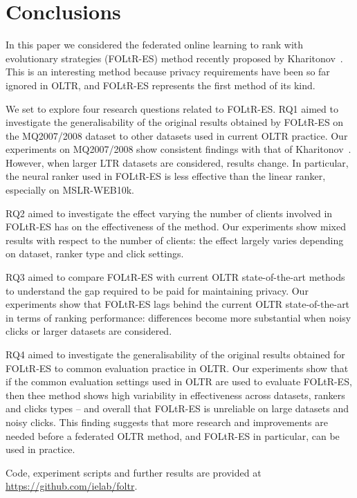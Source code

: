 \section{Conclusions}

In this paper we considered the federated online learning to rank with evolutionary strategies (FOLtR-ES) method recently proposed by Kharitonov~\cite{kharitonov2019federated}. This is an interesting method because privacy requirements have been so far ignored in OLTR, and FOLtR-ES represents the first method of its kind. 

We set to explore four research questions related to FOLtR-ES. RQ1 aimed to investigate the generalisability of the original results obtained by FOLtR-ES on the MQ2007/2008 dataset to other datasets used in current OLTR practice. Our  experiments on MQ2007/2008 show consistent findings with that of Kharitonov~\cite{kharitonov2019federated}. However, when larger LTR datasets are considered, results change. In particular, the neural ranker used in FOLtR-ES is less effective than the linear ranker, especially on MSLR-WEB10k. %

RQ2 aimed to investigate the effect varying the number of clients involved in FOLtR-ES has on the effectiveness of the method. %
Our experiments show mixed results with respect to the number of clients: the effect largely varies depending on dataset, ranker type and click settings. 

RQ3 aimed to compare FOLtR-ES with current OLTR state-of-the-art methods to understand the gap required to be paid for maintaining privacy. Our experiments show that FOLtR-ES lags behind the current OLTR state-of-the-art in terms of ranking performance: differences become more substantial when noisy clicks or larger datasets are considered. 

RQ4 aimed to investigate the generalisability of the original results obtained for FOLtR-ES to common evaluation practice in OLTR. Our experiments show that if the common evaluation settings used in OLTR are used to evaluate FOLtR-ES, then thee method shows high variability in effectiveness across datasets, rankers and clicks types -- and overall that FOLtR-ES is unreliable on large datasets and noisy clicks. This finding suggests that more research and improvements are needed before a federated OLTR method, and FOLtR-ES in particular, can be used in practice. 

Code, experiment scripts and further results are provided at \url{https://github.com/ielab/foltr}. 